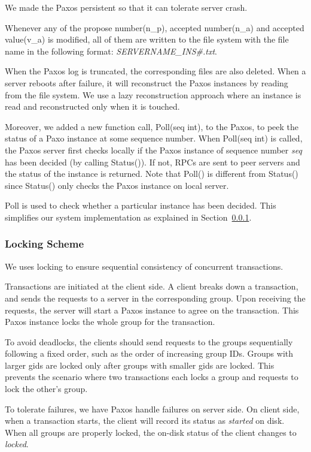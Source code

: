\documentclass{vldb}
\begin{document}
We made the Paxos persistent so that it can tolerate server crash.

Whenever any of the propose number(n\_p), accepted number(n\_a) and 
accepted value(v\_a) is modified, all of them are written to the file 
system with the file name in the following format: 
\textit{SERVERNAME\_INS\#.txt}.

When the Paxos log is truncated, the corresponding files are also 
deleted. When a server reboots after failure, it will reconstruct the 
Paxos instances by reading from the file system. We use a lazy 
reconstruction approach where an instance is read and reconstructed 
only when it is touched.

Moreover, we added a new function call, Poll(seq int), to the Paxos, 
to peek the status of a Paxo instance at some sequence number. When 
Poll(seq int) is called, the Paxos server first checks locally if the 
Paxos instance of sequence number \textit{seq} has been decided (by 
calling Status()). If not, RPCs are sent to peer servers and the 
status of the instance is returned. Note that Poll() is different
from Status() since Status() only checks the Paxos instance on local 
server.

Poll is used to check whether a particular instance has been decided.  
This simplifies our system implementation as explained in 
Section~\ref{sec:lock}.


\subsubsection{Locking Scheme}
\label{sec:lock}

We uses locking to ensure sequential consistency of concurrent 
transactions.

Transactions are initiated at the client side. A client breaks down a 
transaction, and sends the requests to a server in the corresponding 
group. Upon receiving the requests, the server will start a Paxos 
instance to agree on the transaction. This Paxos instance locks the 
whole group for the transaction.

To avoid deadlocks, the clients should send requests to the groups 
sequentially following a fixed order, such as the order of increasing 
group IDs. Groups with larger gids are locked only after groups with 
smaller gids are locked. This prevents the scenario where two 
transactions each locks a group and requests to lock the other's 
group.

To tolerate failures, we have Paxos handle failures on server side. On 
client side, when a transaction starts, the client will record its 
status as \textit{started} on disk. When all groups are properly 
locked, the on-disk status of the client changes to \textit{locked}.
\end{document}
